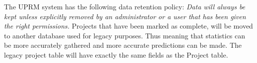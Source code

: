 		The UPRM system has the following data retention policy: \emph{Data will always be kept unless explicitly removed by an administrator or a user that has been given the right permissions.}
		Projects that have been marked as complete, will be moved to another database used for legacy purposes. Thus meaning that statistics can be more accurately gathered and more accurate predictions can be made.
		The legacy project table will have exactly the same fields as the Project table.